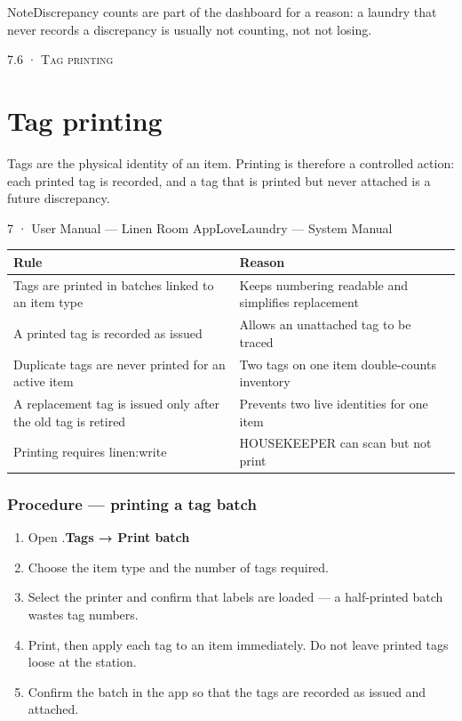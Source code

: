 \documentclass[11pt,a4paper,oneside]{book}
\begin{document}
\begin{notebox}NoteDiscrepancy counts are part of the dashboard for a reason: a laundry that never records a discrepancy is usually not counting, not not losing.\end{notebox}
\textsc{\small\color{crimson}7.6 · Tag printing}\par\medskip
\section*{Tag printing}
Tags are the physical identity of an item. Printing is therefore a controlled action: each printed tag is recorded, and a tag that is printed but never attached is a future discrepancy.

7 · User Manual — Linen Room AppLoveLaundry — System Manual

\begin{center}\small
\begin{tabularx}{\linewidth}{|X|X|}
\hline
\rowcolor{lightgrey}
\textbf{Rule} & \textbf{Reason} \\ \hline
Tags are printed in batches linked to an item type & Keeps numbering readable and simplifies replacement \\ \hline
A printed tag is recorded as issued & Allows an unattached tag to be traced \\ \hline
Duplicate tags are never printed for an active item & Two tags on one item double-counts inventory \\ \hline
A replacement tag is issued only after the old tag is retired & Prevents two live identities for one item \\ \hline
Printing requires linen:write & HOUSEKEEPER can scan but not print \\ \hline
\end{tabularx}
\end{center}
\subsubsection*{Procedure — printing a tag batch}
\begin{enumerate}
\item Open .\textbf{Tags → Print batch}
\item Choose the item type and the number of tags required.
\item Select the printer and confirm that labels are loaded — a half-printed batch wastes tag numbers.
\item Print, then apply each tag to an item immediately. Do not leave printed tags loose at the station.
\item Confirm the batch in the app so that the tags are recorded as issued and attached.
\end{enumerate}
\end{document}
